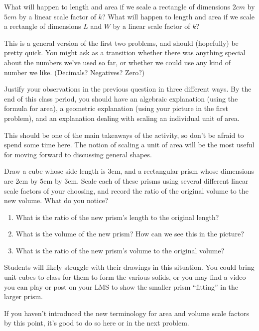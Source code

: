 \documentclass[nooutcomes]{ximera}
\begin{document}

\begin{problem}
What will happen to length and area if we scale a rectangle of dimensions $2 cm$ by $5 cm$ by a linear scale factor of $k$? What will happen to length and area if we scale a rectangle of dimensions $L$ and $W$ by a linear scale factor of $k$?

\begin{instructorNotes}
This is a general version of the first two problems, and should (hopefully) be pretty quick.  You might ask as a transition whether there was anything special about the numbers we've used so far, or whether we could use any kind of number we like.  (Decimals?  Negatives?  Zero?)
\end{instructorNotes}
\end{problem}

\begin{problem}
Justify your observations in the previous question in three different ways.  By the end of this class period, you should have an algebraic explanation (using the formula for area), a geometric explanation (using your picture in the first problem), and an explanation dealing with scaling an individual unit of area.
\begin{instructorNotes}
This should be one of the main takeaways of the activity, so don't be afraid to spend some time here.  The notion of scaling a unit of area will be the most useful for moving forward to discussing general shapes.  
\end{instructorNotes}
\end{problem}

\begin{problem}
Draw a cube whose side length is 3cm, and a rectangular prism whose dimensions are 2cm by 5cm by 3cm.  Scale each of these prisms using several different linear scale factors of your choosing, and record the ratio of the original volume to the new volume.  What do you notice?
\vskip 2.3in
\begin{enumerate}
    \item What is the ratio of the new prism's length to the original  length?
    \item What is the volume of the new prism?  How can we see this in the picture?
    \item What is the ratio of the new prism's volume to the original volume?
\end{enumerate}
\begin{instructorNotes}
Students will likely struggle with their drawings in this situation.  You could bring unit cubes to class for them to form the various solids, or you may find a video you can play or post on your LMS to show the smaller prism ``fitting'' in the larger prism.  

If you haven't introduced the new terminology for area and volume scale factors by this point, it's good to do so here or in the next problem.
\end{instructorNotes}
\end{problem}
\end{document}
